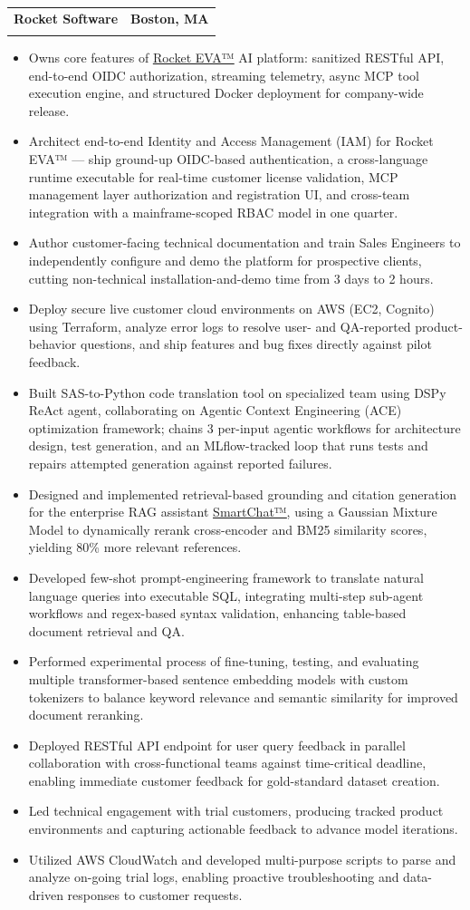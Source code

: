 \documentclass[letterpaper,11pt]{article}
\makeatletter
\newcommand{\resumeSubheading}[4]{
  \vspace{-2pt}\item
    \begin{tabular*}{1.0\textwidth}[t]{l@{\extracolsep{\fill}}r}
      \textbf{#1} & \textbf{\small #2} \\
      \hspace{12pt}\text{#3} & \text{\small #4} \\
      
    \end{tabular*}\vspace{-7pt}
}
\newcommand{\resumeItemListStart}{\begin{itemize}[itemsep=-1pt, parsep=2pt]}
\newcommand{\resumeItemListEnd}{\end{itemize}\vspace{-5pt}}
\newcommand{\resumeItem}[1]{\item\small{#1}}
\makeatother
\begin{document}
    \resumeSubheading
      {Rocket Software} {Boston, MA} 
      {Machine Learning Software Engineer III}{09/2024 -- Present}
      \resumeItemListStart
        \resumeItem{Owns core features of \href{https://www.rocketsoftware.com/en-us/products/eva}{\underline{Rocket EVA™}} AI platform: sanitized RESTful API, end-to-end OIDC authorization, streaming telemetry, async MCP tool execution engine, and structured Docker deployment for company-wide release.}
        \resumeItem{Architect end-to-end Identity and Access Management (IAM) for Rocket EVA™ — ship ground-up OIDC-based authentication, a cross-language runtime executable for real-time customer license validation, MCP management layer authorization and registration UI, and cross-team integration with a mainframe-scoped RBAC model in one quarter.}
        \resumeItem{Author customer-facing technical documentation and train Sales Engineers to independently configure and demo the platform for prospective clients, cutting non-technical installation-and-demo time from 3 days to 2 hours.}
        \resumeItem{Deploy secure live customer cloud environments on AWS (EC2, Cognito) using Terraform, analyze error logs to resolve user- and QA-reported product-behavior questions, and ship features and bug fixes directly against pilot feedback.}
        \resumeItem{Built SAS-to-Python code translation tool on specialized team using DSPy ReAct agent, collaborating on Agentic Context Engineering (ACE) optimization framework; chains 3 per-input agentic workflows for architecture design, test generation, and an MLflow-tracked loop that runs tests and repairs attempted generation against reported failures.}
        \resumeItem{Designed and implemented retrieval-based grounding and citation generation for the enterprise RAG assistant \href{https://www.rocketsoftware.com/sites/default/files/resource_files/smart-chat-brochure.pdf}{\underline{SmartChat™}}, using a Gaussian Mixture Model to dynamically rerank cross-encoder and BM25 similarity scores, yielding 80\% more relevant references.}
        \resumeItem{Developed few-shot prompt-engineering framework to translate natural language queries into executable SQL, integrating multi-step sub-agent workflows and regex-based syntax validation, enhancing table-based document retrieval and QA.}
        \resumeItem{Performed experimental process of fine-tuning, testing, and evaluating multiple transformer-based sentence embedding models with custom tokenizers to balance keyword relevance and semantic similarity for improved document reranking.}
        \resumeItem{Deployed RESTful API endpoint for user query feedback in parallel collaboration with cross-functional teams against time-critical deadline, enabling immediate customer feedback for gold-standard dataset creation.}
        \resumeItem{Led technical engagement with trial customers, producing tracked product environments and capturing actionable feedback to advance model iterations.}
        \resumeItem{Utilized AWS CloudWatch and developed multi-purpose scripts to parse and analyze on-going trial logs, enabling proactive troubleshooting and data-driven responses to customer requests.}
      \resumeItemListEnd 
\end{document}
